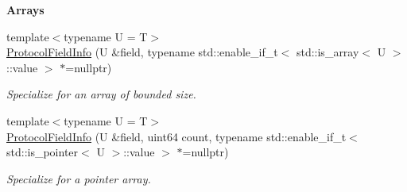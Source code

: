 \begin{Indent}\textbf{ Arrays}\par
\begin{DoxyCompactItemize}
\item 
\mbox{\label{structrev_1_1_protocol_field_info_aa01ada16e78572972091121248743d85}} 
{\footnotesize template$<$typename U  = T$>$ }\\\mbox{\hyperlink{structrev_1_1_protocol_field_info_aa01ada16e78572972091121248743d85}{Protocol\+Field\+Info}} (U \&field, typename std\+::enable\+\_\+if\+\_\+t$<$ std\+::is\+\_\+array$<$ U $>$\+::value $>$ $\ast$=nullptr)
\begin{DoxyCompactList}\small\item\em Specialize for an array of bounded size. \end{DoxyCompactList}\item 
\mbox{\label{structrev_1_1_protocol_field_info_aab872f8de28c5ccad032a87b31ed96de}} 
{\footnotesize template$<$typename U  = T$>$ }\\\mbox{\hyperlink{structrev_1_1_protocol_field_info_aab872f8de28c5ccad032a87b31ed96de}{Protocol\+Field\+Info}} (U \&field, uint64 count, typename std\+::enable\+\_\+if\+\_\+t$<$ std\+::is\+\_\+pointer$<$ U $>$\+::value $>$ $\ast$=nullptr)
\begin{DoxyCompactList}\small\item\em Specialize for a pointer array. \end{DoxyCompactList}\end{DoxyCompactItemize}
\end{Indent}
